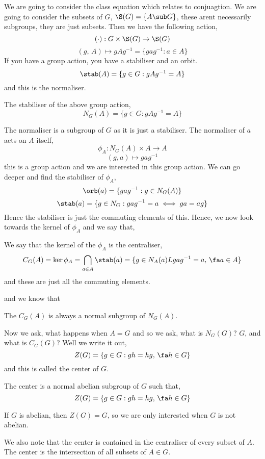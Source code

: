 We are going to consider the class equation which relates to conjuagtion. We are going to consider the subsets of $G$, $\S(G) = \{A \sub G\}$, these arent necessarily subgroups, they are just subsets. Then we have the following action,
$$ (\cdot) : G \times \S(G) \to \S(G)$$
$$ (g,\,A) \mapsto gAg^{-1} = \{gag^{-1} : a \in A\}$$
If you have a group action, you have a stabiliser and an orbit.
$$ \stab(A) = \{g \in G : gAg^{-1} = A\} $$
and this is the normaliser.
\begin{ndefi}[Normaliser]
  The stabiliser of the above group action,
  $$ N_G(A) = \{g \in G : gAg^{-1} = A\} $$
\end{ndefi}
The normaliser is a subgroup of $G$ as it is just a stabiliser. The normaliser of $a$ acts on $A$ itself,
$$ \phi_A : N_G(A) \times A \to A $$
$$ (g, a) \mapsto gag^{-1}$$
this is a group action and we are interested in this group action. We can go deeper and find the stabiliser of $\phi_A$,
$$ \orb(a) = \{gag^{-1} : g \in N_G(A)\} $$
$$ \stab(a) = \{g \in N_G : gag^{-1}=a \iff ga = ag\} $$
Hence the stabiliser is just the commuting elements of this. Hence, we now look towards the kernel of $\phi_A$ and we say that,
\begin{ndefi}[Centraliser]
  We say that the kernel of the $\phi_A$ is the centraliser,
  $$C_G(A) = \ker \phi_A = \bigcap_{a \in A}\stab(a) = \{g \in N_A(a) L gag^{-1} = a,\,\fa a \in A\} $$
  and these are just all the commuting elements.
\end{ndefi}
and we know that
\begin{nlemma}
  The $C_G(A)$ is always a normal subgroup of $N_G(A)$.
\end{nlemma}
Now we ask, what happens when $A = G$ and so we ask, what is $N_G(G)$? $G$, and what is $C_G(G)$? Well we write it out,
$$ Z(G) = \{g \in G : gh = hg,\, \fa h \in G\} $$
and this is called the center of $G$.
\begin{ndefi}[Center of $G$]
  The center is a normal abelian subgroup of $G$ such that,
  $$ Z(G) = \{g \in G : gh = hg,\, \fa h \in G\} $$
\end{ndefi}

\begin{eg}
  If $G$ is abelian, then $Z(G) = G$, so we are only interested when $G$ is not abelian.
\end{eg}

We also note that the center is contained in the centraliser of every subset of $A$. The center is the intersection of all subsets of $A \in G$.


